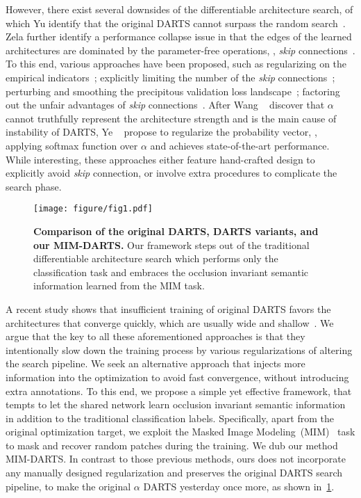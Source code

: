 \documentclass[10pt,twocolumn,letterpaper]{article}
\begin{document}
However, there exist several downsides of the differentiable architecture search, of which Yu \etal identify that the original DARTS cannot surpass the random search~\cite{Yu2020Evaluating}.
Zela \etal further identify a performance collapse issue in that the edges of the learned architectures are dominated by the parameter-free operations, \eg, \textit{skip} connections~\cite{Zela2020Understanding}. 
To this end, various approaches have been proposed, such as regularizing on the empirical indicators~\cite{Zela2020Understanding};
explicitly limiting the number of the \textit{skip} connections~\cite{Chen_2019_pdarts,liang2019darts+};
perturbing and smoothing the precipitous validation loss landscape~\cite{chen_2020_sdarts}; 
factoring out the unfair advantages of \textit{skip} connections~\cite{chu2021dartsminus,chu_2020_fairdarts}.
After Wang \etal ~\cite{wang_2021_rethinking} discover that $\alpha$ cannot truthfully represent the architecture strength and is the main cause of instability of DARTS,
Ye \etal~ propose to regularize the probability vector, \ie, applying softmax function over $\alpha$ 
and achieves state-of-the-art performance.
While interesting, these approaches either feature 
hand-crafted design to explicitly avoid \textit{skip} connection, or involve extra 
procedures
to complicate the search phase.

\begin{figure}[t]
    \centering
     \texttt{[image: figure/fig1.pdf]}
     \vspace{-6pt}
     \caption{\textbf{Comparison of the original DARTS, DARTS variants, and our MIM-DARTS.}
     Our framework steps out of the traditional differentiable architecture search which performs only the classification task
     and embraces the occlusion invariant semantic information learned from the MIM task.
     }
     \label{fig:fig1}
     \vspace{-8pt}
  \end{figure}
   
A recent study shows that insufficient training of original DARTS favors the architectures that converge quickly, which are usually wide and shallow~\cite{shu_2020_understanding}. 
We argue that the key to all these 
aforementioned
approaches is that they intentionally slow down the training process by various regularizations of altering the search pipeline. 
We seek an alternative approach that injects more information into the optimization to avoid fast convergence, without introducing extra annotations. 
To this end, we propose a simple yet effective 
framework, that tempts to let the shared network learn occlusion invariant semantic information~\cite{Kong_2022_Occlusion} in addition to the traditional classification labels.
Specifically, apart from the original optimization target, we exploit the Masked Image Modeling~(MIM)~\cite{bao2022beit,He_2022_mae}
task to mask and recover random patches during the training. 
We dub our method MIM-DARTS. 
In contrast to those previous methods, ours does not incorporate any manually designed regularization and preserves the original DARTS search pipeline, to make the original $\alpha$ DARTS yesterday once more, as shown in~\cref{fig:fig1}.
\end{document}
